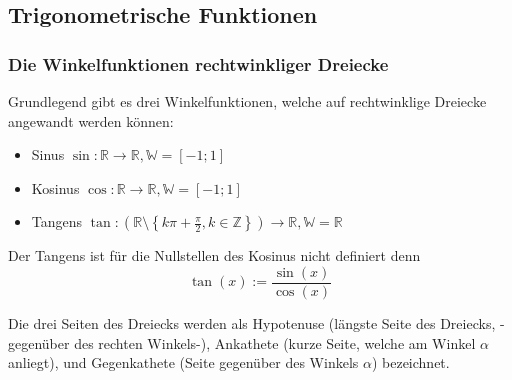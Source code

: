 \subsection{Trigonometrische Funktionen}
\subsubsection{Die Winkelfunktionen rechtwinkliger Dreiecke}
Grundlegend gibt es drei Winkelfunktionen, welche auf rechtwinklige Dreiecke angewandt werden können:
\begin{itemize}
\item Sinus $\sin : \mathbb{R} \to \mathbb{R}, \mathbb{W} = \left[-1;1 \right]$
\item Kosinus $\cos : \mathbb{R} \to \mathbb{R}, \mathbb{W} = \left[ -1;1 \right]$
\item Tangens $\tan : \left( \mathbb{R} \setminus \left\{ k \pi + \frac{\pi}{2}, k \in \mathbb{Z} \right\} \right) \to \mathbb{R}, \mathbb{W} = \mathbb{R}$
\end{itemize}
\begin{warning}
	Der Tangens ist für die Nullstellen des Kosinus nicht definiert denn
	\begin{equation*}
	\tan(x) := \frac{\sin(x)}{\cos(x)}
	\end{equation*}
\end{warning}
Die drei Seiten des Dreiecks werden als Hypotenuse (längste Seite des Dreiecks, -gegenüber des rechten Winkels-), Ankathete (kurze Seite, welche am Winkel $\alpha$ anliegt), und Gegenkathete (Seite gegenüber des Winkels $\alpha$) bezeichnet.\\

